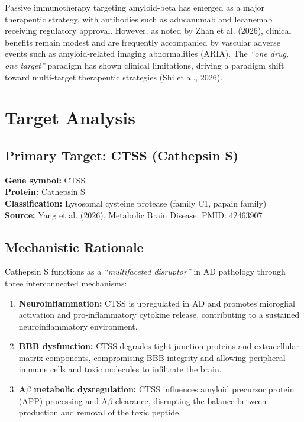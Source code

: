 \documentclass[11pt, a4paper]{article}
\begin{document}
Passive immunotherapy targeting amyloid-beta has emerged as a major therapeutic strategy, with antibodies such as aducanumab and lecanemab receiving regulatory approval. However, as noted by Zhan et al. (2026), clinical benefits remain modest and are frequently accompanied by vascular adverse events such as amyloid-related imaging abnormalities (ARIA). The \textit{``one drug, one target''} paradigm has shown clinical limitations, driving a paradigm shift toward multi-target therapeutic strategies (Shi et al., 2026).

\section{Target Analysis}

\subsection{Primary Target: CTSS (Cathepsin S)}

\textbf{Gene symbol:} CTSS \\
\textbf{Protein:} Cathepsin S \\
\textbf{Classification:} Lysosomal cysteine protease (family C1, papain family) \\
\textbf{Source:} Yang et al. (2026), Metabolic Brain Disease, PMID: 42463907

\subsection{Mechanistic Rationale}

Cathepsin S functions as a \textit{``multifaceted disruptor''} in AD pathology through three interconnected mechanisms:

\begin{enumerate}
    \item \textbf{Neuroinflammation:} CTSS is upregulated in AD and promotes microglial activation and pro-inflammatory cytokine release, contributing to a sustained neuroinflammatory environment.
    \item \textbf{BBB dysfunction:} CTSS degrades tight junction proteins and extracellular matrix components, compromising BBB integrity and allowing peripheral immune cells and toxic molecules to infiltrate the brain.
    \item \textbf{A$\beta$ metabolic dysregulation:} CTSS influences amyloid precursor protein (APP) processing and A$\beta$ clearance, disrupting the balance between production and removal of the toxic peptide.
\end{enumerate}
\end{document}
